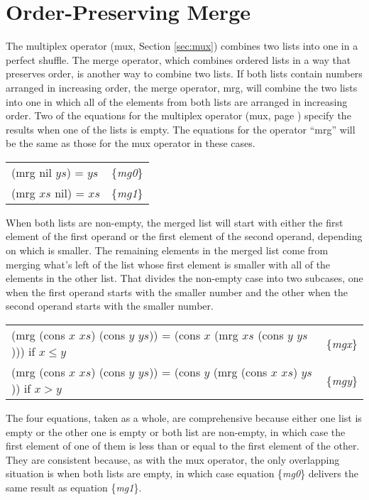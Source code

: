 \section{Order-Preserving Merge}
\label{sec:mrg}

The multiplex operator (mux, Section \ref{sec:mux})
combines two lists into one in a perfect shuffle.
The merge operator, which combines ordered lists
in a way that preserves order, is another way to combine two lists.
If both lists contain numbers arranged in increasing order,
the merge operator, mrg,
will combine the two lists
into one in which all of the elements from both lists
are arranged in increasing order.
Two of the equations for the multiplex operator (mux, page \pageref{def:mux})
specify the results when one of the lists is empty.
The equations for the operator ``mrg'' will be the same as those for
the mux operator in these cases.

\begin{center}
\begin{tabular}{ll}
(mrg nil $ys$) = $ys$ & \{\emph{mg0}\} \\
(mrg $xs$ nil) = $xs$ & \{\emph{mg1}\} \\
\end{tabular}
\end{center}

When both lists are non-empty, the merged list will
start with either the first element of the first operand
or the first element of the second operand,
depending on which is smaller.
The remaining elements in the merged list come from
merging what's left of the list whose first element is smaller
with all of the elements in the other list.
That divides the non-empty case into two
subcases, one when the first operand starts with the smaller number
and the other when the second operand starts with the smaller number.

\begin{center}
\begin{tabular}{ll}
(mrg (cons $x$ $xs$) (cons $y$ $ys$)) = (cons $x$ (mrg $xs$ (cons $y$ $ys$))) if $x \le y$ & \{\emph{mgx}\} \\
(mrg (cons $x$ $xs$) (cons $y$ $ys$)) = (cons $y$ (mrg (cons $x$ $xs$) $ys$)) if $x > y$   & \{\emph{mgy}\} \\
\end{tabular}
\end{center}

The four equations, taken as a whole, are comprehensive
because either one list is empty or the other one is empty
or both list are non-empty, in which case the first element of one of them
is less than or equal to the first element of the other.
They are consistent because, as with the mux operator, the only overlapping situation is when
both lists are empty, in which case equation \{\emph{mg0}\}
delivers the same result as equation \{\emph{mg1}\}.

